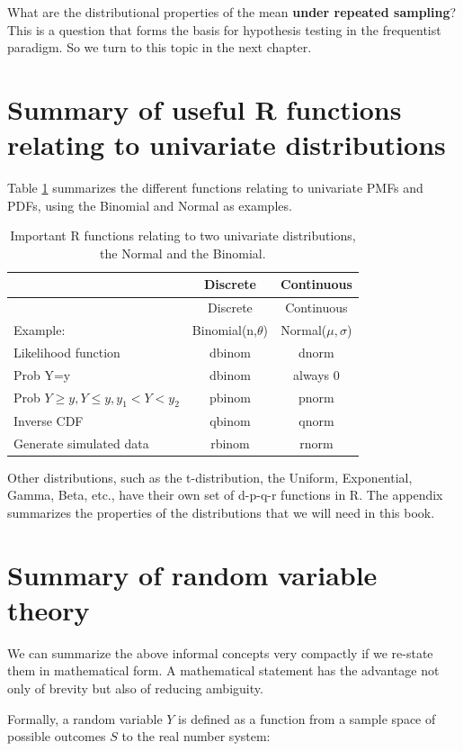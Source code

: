 \documentclass[12pt,]{krantz}
\begin{document}
What are the distributional properties of the mean \textbf{under repeated sampling}? This is a question that forms the basis for hypothesis testing in the frequentist paradigm. So we turn to this topic in the next chapter.

\hypertarget{summary-of-useful-r-functions-relating-to-univariate-distributions}{%
\section{Summary of useful R functions relating to univariate distributions}\label{summary-of-useful-r-functions-relating-to-univariate-distributions}}

Table \ref{tab:dpqrfunctions} summarizes the different functions relating to univariate PMFs and PDFs, using the Binomial and Normal as examples.

\begin{longtable}[]{@{}lcc@{}}
\caption{\label{tab:dpqrfunctions} Important R functions relating to two univariate distributions, the Normal and the Binomial.}\tabularnewline
\toprule
& Discrete & Continuous\tabularnewline
\midrule
\endfirsthead
\toprule
& Discrete & Continuous\tabularnewline
\midrule
\endhead
Example: & Binomial(n,\(\theta\)) & Normal(\(\mu,\sigma\))\tabularnewline
Likelihood function & dbinom & dnorm\tabularnewline
Prob Y=y & dbinom & always 0\tabularnewline
Prob \(Y\geq y, Y\leq y, y_1<Y<y_2\) & pbinom & pnorm\tabularnewline
Inverse CDF & qbinom & qnorm\tabularnewline
Generate simulated data & rbinom & rnorm\tabularnewline
\bottomrule
\end{longtable}

Other distributions, such as the t-distribution, the Uniform, Exponential, Gamma, Beta, etc., have their own set of d-p-q-r functions in R. The appendix summarizes the properties of the distributions that we will need in this book.

\hypertarget{summary-of-random-variable-theory}{%
\section{Summary of random variable theory}\label{summary-of-random-variable-theory}}

We can summarize the above informal concepts very compactly if we re-state them in mathematical form. A mathematical statement has the advantage not only of brevity but also of reducing ambiguity.

Formally, a random variable \(Y\) is defined as a function from a sample space of possible outcomes \(S\) to the real number system:
\end{document}
